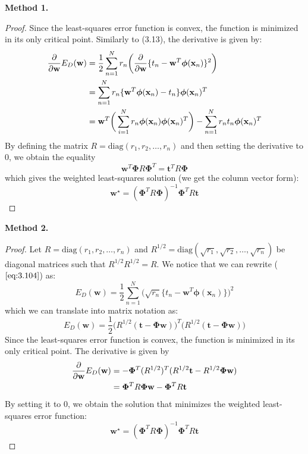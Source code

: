 \vspace{1em}

\textbf{Method 1.}

\begin{proof}
    Since the least-squares error function is convex,
    the function is minimized in its only critical 
    point. Similarly to (3.13), the derivative is given by:
    \begin{align*}
        \pdv{\mathbf{w}} E_D(\mathbf{w})
        &= \frac{1}{2} \sum_{n=1}^{N} r_n \bigg(\pdv{\mathbf{w}} 
        \{t_n - \mathbf{w}^T \bm{\phi}(\mathbf{x}_n)\}^2\bigg) \\
        &= \sum_{n=1}^N r_n \{\mathbf{w}^T \bm{\phi}(\mathbf{x}_n) - t_n\} 
        \bm{\phi}(\mathbf{x}_n)^T \\
        &= \mathbf{w}^T 
        \bigg(\sum_{i=1}^{N} r_n \bm{\phi}(\mathbf{x}_n)
        \bm{\phi}(\mathbf{x}_n)^T\bigg) -
        \sum_{n=1}^{N} r_n t_n \bm{\phi}(\mathbf{x}_n)^T
    \end{align*}
    By defining the matrix $R = \text{diag}(r_1, r_2, \ldots, r_n)$
    and then setting the derivative to 0, we obtain the equality
    \[
        \mathbf{w}^T \mathbf{\Phi}R\mathbf{\Phi}^T
        = \mathbf{t}^TR\mathbf{\Phi} 
    \] 
    which gives the weighted least-squares solution (we get the
    column vector form):
    \[
        \mathbf{w}^\star = (\mathbf{\Phi}^TR\mathbf{\Phi})^{-1} \mathbf{\Phi}^T R \mathbf{t} 
    \] 
\end{proof}

\textbf{Method 2.}
\begin{proof}
    Let $R = \text{diag}(r_1, r_2, \ldots, r_n)$ and
    $R^{1/2} = \text{diag}(\sqrt{r_1}, \sqrt{r_2}, \ldots, \sqrt{r_n})$ be
    diagonal matrices such that $R^{1/2}R^{1/2} = R$. We notice that we can 
    rewrite ($\ref{eq:3.104}$) as:
    \[
        E_D(\mathbf{w}) = \frac{1}{2} \sum_{n=1}^{N} 
        \big(\sqrt{r_n}\{t_n - \mathbf{w}^T \bm{\phi}(\mathbf{x}_n)\}\big)^2
    \] 
    which we can translate into matrix notation as:
    \[
        E_D(\mathbf{w}) = \frac{1}{2} \big(R^{1/2}(\mathbf{t} - \mathbf{\Phi}\mathbf{w})\big)^T
        \big(R^{1/2}(\mathbf{t} - \mathbf{\Phi}\mathbf{w})\big)
    \] 
    Since the least-squares error function is convex, the function
    is minimized in its only critical point. The derivative is given by
    \begin{align*}
        \pdv{\mathbf{w}} E_D(\mathbf{w})
        &= -\mathbf{\Phi}^T(R^{1/2})^T(R^{1/2}\mathbf{t} - R^{1/2}\mathbf{\Phi}\mathbf{w}) \\
        &= \mathbf{\Phi}^TR\mathbf{\Phi}\mathbf{w} - \mathbf{\Phi}^TR\mathbf{t}
    \end{align*}
    By setting it to 0, we obtain the solution that minimizes the weighted
    least-squares error function:
    \[
        \mathbf{w}^\star = (\mathbf{\Phi}^TR\mathbf{\Phi})^{-1} \mathbf{\Phi}^T R \mathbf{t} 
    \] 
\end{proof}

